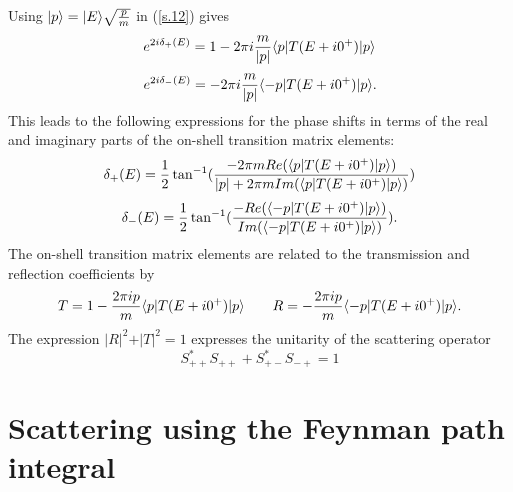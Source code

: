 \documentclass[aps,prc,reprint,noshowpacs,groupedaddress,onecolumn]{revtex4}
\def\beq{\begin{equation}}
\def\eeq{\end{equation}}
\begin{document}
Using $\vert p \rangle = \vert E \rangle \sqrt{{p\over m}}$ in
(\ref{s.12}) gives
\beq
e^{2 i \delta_+ (E)}= 1 - 2 \pi i {m \over \vert p \vert }  
\langle p \vert T(E+i0^+) \vert p \rangle
\label{s.14}
\eeq
\beq
e^{2 i \delta_- (E)}= - 2 \pi i {m \over \vert p \vert }  
\langle -p \vert T(E+i0^+) \vert p \rangle .
\label{s.15}
\eeq
This leads to the following expressions for the phase shifts in terms of 
the real and imaginary parts of the on-shell transition matrix elements:
\beq
\delta_{+} (E) = {1 \over 2} \tan^{-1} ({-2 \pi m Re(\langle  p \vert
T(E+i0^+) \vert p
\rangle) 
\over \vert p\vert  + 2 \pi m 
Im (\langle  p \vert T(E+i0^+) \vert p \rangle)})
\label{s.16}
\eeq
\beq
\delta_{-} (E) = {1 \over 2} \tan^{-1} ({- Re(\langle - p \vert T (E+i0^+)
\vert p
\rangle) 
\over  
Im (\langle - p \vert T(E+i0^+) \vert p \rangle)}) .
\label{s.16}
\eeq
The on-shell transition matrix elements are related to the transmission
and reflection coefficients by
\beq
T=1-{2 \pi i p \over m} \langle p \vert T(E+i0^+) \vert p \rangle
\qquad
R= -{2 \pi i p \over m} \langle -p \vert T(E+i0^+) \vert p \rangle .
\label{s.16}
\eeq
The expression $\vert R\vert^2 + \vert T \vert^2=1$ expresses the unitarity
of the scattering operator
\beq
S_{++}^* S_{++} + S_{+-}^* S_{-+} =1
\label{s.16}
\eeq


\section{ Scattering using the Feynman path integral} 
\end{document}

